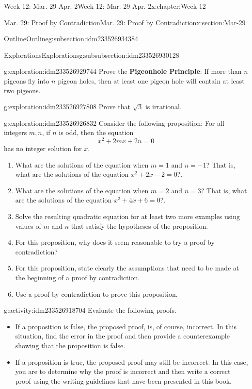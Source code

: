 \documentclass[oneside,10pt,]{book}
\newcommand{\terminology}[1]{\textbf{#1}}
\numberwithin{equation}{section}
\begin{document}
\begin{chapterptx}{Week 12: Mar. 29-Apr. 2}{}{Week 12: Mar. 29-Apr. 2}{}{}{x:chapter:Week-12}
\begin{sectionptx}{Mar. 29: Proof by Contradiction}{}{Mar. 29: Proof by Contradiction}{}{}{x:section:Mar-29}
\begin{subsectionptx}{Outline}{}{Outline}{}{}{g:subsection:idm233526934384}
%
\begin{subsubsectionptx}{Explorations}{}{Explorations}{}{}{g:subsubsection:idm233526930128}
\begin{exploration}{}{g:exploration:idm233526929744}%
Prove the \terminology{Pigeonhole Principle}: If more than \(n\) pigeons fly into \(n\) pigeon holes, then at least one pigeon hole will contain at least two pigeons.%
\end{exploration}%
\begin{exploration}{}{g:exploration:idm233526927808}%
Prove that \(\sqrt{3}\) is irrational.%
\end{exploration}%
\begin{exploration}{}{g:exploration:idm233526926832}%
Consider the following proposition: For all integers \(m,n\), if \(n\) is odd, then the equation%
\begin{equation*}
x^2 + 2mx + 2n = 0
\end{equation*}
has no integer solution for \(x\).%
%
\begin{enumerate}
\item{}What are the solutions of the equation when \(m=1\) and \(n=-1\)? That is, what are the solutions of the equation \(x^2 + 2x - 2 = 0\)?.%
\item{}What are the solutions of the equation when \(m=2\) and \(n=3\)? That is, what are the solutions of the equation \(x^2 + 4x +6 = 0\)?.%
\item{}Solve the resulting quadratic equation for at least two more examples using values of \(m\) and \(n\) that satisfy the hypotheses of the proposition.%
\item{}For this proposition, why does it seem reasonable to try a proof by contradiction?%
\item{}For this proposition, state clearly the assumptions that need to be made at the beginning of a proof by contradiction.%
\item{}Use a proof by contradiction to prove this proposition.%
\end{enumerate}
\end{exploration}%
\begin{activity}{}{g:activity:idm233526918704}%
Evaluate the following proofs.%
\begin{itemize}[label=\textbullet]
\item{}If a proposition is false, the proposed proof, is, of course, incorrect. In this situation, find the error in the proof and then provide a counterexample showing that the proposition is false.%
\item{}If a proposition is true, the proposed proof may still be incorrect. In this case, you are to determine why the proof is incorrect and then write a correct proof using the writing guidelines that have been presented in this book.%

\end{itemize}
\end{activity}
\end{subsubsectionptx}
\end{subsectionptx}
\end{sectionptx}
\end{chapterptx}
\end{document}

